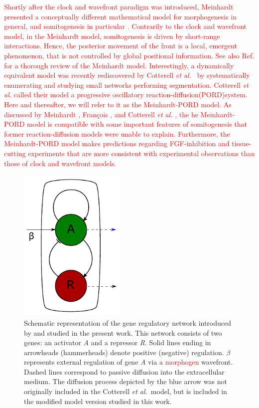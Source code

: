 \documentclass[%
 preprint,
 aip, 
 amsmath,amssymb,
]{revtex4-2}
\begin{document}
\textcolor{red}{Shortly after the clock and wavefront paradigm was introduced, Meinhardt presented a conceptually different mathematical model for morphogenesis in general, and somitogenesis in particular \cite{Meinhardt1982}. Contrarily to the clock and wavefront model, in the Meinhardt model, somitogenesis is driven by short-range interactions. Hence, the posterior movement of the front is a local, emergent phenomenon, that is not controlled by global positional information. See also Ref. \cite{Francois2018} for a thorough review of the Meinhardt model. Interestingly, a dynamically equivalent model was recently rediscovered by Cotterell \emph{et al.}~\cite{Cotterell2015} by systematically enumerating and studying small networks performing segmentation. Cotterell \emph{et al.} called their model a progressive oscillatory reaction-diffusion(PORD)system. Here and thereafter, we will refer to it as the Meinhardt-PORD model. As discussed by Meinhardt \citep{Meinhardt1982}, Fran\c{c}ois \citep{Francois2018}, and Cotterell \emph{et al.} \cite{Cotterell2015}, the he Meinhardt-PORD model is compatible with some important features of somitogenesis that former reaction-diffusion models were unable to explain. Furthermore, the Meinhardt-PORD model makes predictions regarding FGF-inhibition and tissue-cutting experiments that are more consistent with experimental observations than those of clock and wavefront models.}
	
	\begin{figure}[t!]
		\centering
		\includegraphics[width=2in]{Figures/Fig01.pdf}
		\caption{Schematic representation of the gene regulatory network introduced by
			\cite{Cotterell2015} and studied in the present work. This network consists of
			two genes: an activator \textit{A} and a repressor \textit{R}. Solid lines
			ending in arrowheads (hammerheads) denote positive (negative) regulation.
			$\beta$ represents external regulation of gene \textit{A} via a 
			\textcolor{red}{morphogen} wavefront. Dashed lines correspond to passive diffusion into the extracellular
			medium. The diffusion process depicted by the blue arrow was not
			originally included in the Cotterell {\em et al.}~model, but is 
			included in the modified model version studied in this work.}
		\label{Fig01}
	\end{figure}
	
\end{document}
